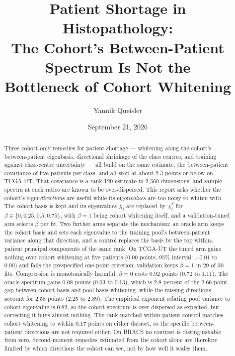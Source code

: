 \documentclass[11pt]{article}
\title{Patient Shortage in Histopathology:\\The Cohort's Between-Patient Spectrum Is Not the\\Bottleneck of Cohort Whitening}
\author{Yannik Queisler}
\date{September 21, 2026}
\begin{document}
\raggedbottom
{}
\setlength{\emergencystretch}{2em}
\maketitle
\begin{abstract}
\noindent Three cohort-only remedies for patient shortage --- whitening along the cohort's between-patient eigenbasis, directional shrinkage of the class centres, and training against class-centre uncertainty --- all build on the same estimate, the between-patient covariance of five patients per class, and all stop at about 2.3 points or below on TCGA-UT. That covariance is a rank-120 estimate in 2,560 dimensions, and sample spectra at such ratios are known to be over-dispersed. This report asks whether the cohort's eigen\emph{directions} are useful while its eigen\emph{values} are too noisy to whiten with. The cohort basis is kept and its eigenvalues $\lambda_j$ are replaced by $\lambda_j^\beta$ for $\beta\in\{0,0.25,0.5,0.75\}$, with $\beta=1$ being cohort whitening itself, and a validation-tuned arm selects $\beta$ per fit. Two further arms separate the mechanism: an oracle arm keeps the cohort basis and sets each eigenvalue to the training pool's between-patient variance along that direction, and a control replaces the basis by the top within-patient principal components of the same rank. On TCGA-UT the tuned arm gains nothing over cohort whitening at five patients (0.00 points, 95\% interval: $-0.01$ to 0.00) and fails the prespecified one-point criterion; validation keeps $\beta=1$ in 29 of 30 fits. Compression is monotonically harmful: $\beta=0$ costs 0.92 points (0.72 to 1.11). The oracle spectrum gains 0.08 points (0.03 to 0.13), which is 2.8 percent of the 2.66-point gap between cohort-basis and pool-basis whitening, while the missing directions account for 2.58 points (2.25 to 2.89). The empirical exponent relating pool variance to cohort eigenvalue is 0.82, so the cohort spectrum is over-dispersed as expected, but correcting it buys almost nothing. The rank-matched within-patient control matches cohort whitening to within 0.17 points on either dataset, so the specific between-patient directions are not required either. On BRACS no contrast is distinguishable from zero. Second-moment remedies estimated from the cohort alone are therefore limited by which directions the cohort can see, not by how well it scales them.
\end{abstract}
\end{document}
